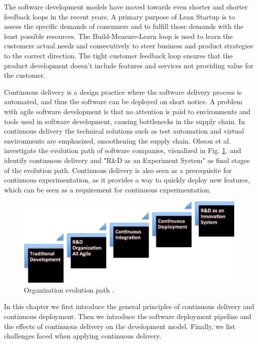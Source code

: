\documentclass[english]{tktltiki2}
\theoremstyle{definition}
\theoremstyle{remark}
\begin{document}
The software development models have moved towards even shorter and shorter feedback loops in the recent years. A primary purpose of Lean Startup is to assess the specific demands of consumers and to fulfill those demands with the least possible resources. The Build-Measure-Learn loop is used to learn the customers actual needs and consecutively to steer business and product strategies to the correct direction. The tight customer feedback loop ensures that the product development doesn't include features and services not providing value for the customer. 

Continuous delivery is a design practice where the software delivery process is automated, and thus the software can be deployed on short notice. A problem with agile software development is that no attention is paid to environments and tools used in software development, causing bottlenecks in the supply chain. In continuous delivery the technical solutions such as test automation and virtual environments are emphasized, smoothening the supply chain. Olsson et al. investigate the evolution path of software companies, visualized in Fig. \ref{fig1}. and identify continuous delivery and "R\&D as an Experiment System" as final stages \cite{olsson2012climbing} of the evolution path. Continuous delivery is also seen as a prerequisite for continuous experimentation, as it provides a way to quickly deploy new features, which can be seen as a requirement for continuous experimentation.

\begin{figure}[h]
	\centering
	\includegraphics[width=5.0in]{stairway.png}
	\caption{Organization evolution path \cite{olsson2012climbing}.}
	\label{fig1}
\end{figure}

In this chapter we first introduce the general principles of continuous delivery and continuous deployment. Then we introduce the software deployment pipeline and the effects of continuous delivery on the development model. Finally, we list challenges faced when applying continuous delivery.
\end{document}
